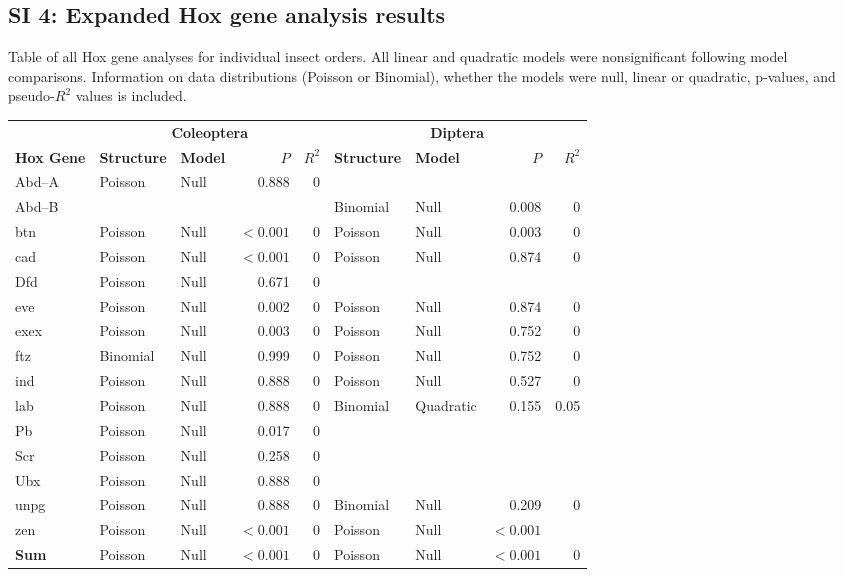 \documentclass[11pt]{article}
\begin{document}
\subsection*{SI 4: Expanded Hox gene analysis results}
Table of all Hox gene analyses for individual insect orders. All linear and quadratic models were nonsignificant following model comparisons. Information on data distributions (Poisson or Binomial), whether the models were null, linear or quadratic, p-values, and pseudo-$R^2$ values is included.
\singlespacing
\centering
\begin{tabular}{lllrrllrr}

 & \multicolumn{4}{c}{\textbf{Coleoptera}} & \multicolumn{4}{c}{\textbf{Diptera}} \\
\cmidrule(lr){2-5} \cmidrule(lr){6-9}
\textbf{Hox Gene} & \textbf{Structure} & \textbf{Model} & \textbf{$P$} & \textbf{$R^2$} & \textbf{Structure} & \textbf{Model} & \textbf{$P$} & \textbf{$R^2$} \\
\cmidrule(lr){1-9}
Abd--A & Poisson & Null & 0.888 & 0 &&&& \\
Abd--B &  &  &  &  & Binomial & Null & 0.008 & 0 \\
btn & Poisson & Null & $<0.001$ & 0 & Poisson & Null & 0.003 & 0 \\
cad & Poisson & Null & $<0.001$ & 0 & Poisson & Null & 0.874 & 0 \\
Dfd & Poisson & Null & 0.671 & 0 &  &  &  &  \\
eve & Poisson & Null & 0.002 & 0 & Poisson & Null & 0.874 & 0 \\
exex & Poisson & Null & 0.003 & 0 & Poisson & Null & 0.752 & 0 \\
ftz & Binomial & Null & 0.999 & 0 & Poisson & Null & 0.752 & 0 \\
ind & Poisson & Null & 0.888 & 0 & Poisson & Null & 0.527 & 0 \\
lab	& Poisson & Null	& 0.888 &	0	&Binomial&	Quadratic &	0.155&	0.05\\
Pb	& Poisson & Null	& 0.017&	0		& & & &	\\	
Scr	& Poisson & Null	 & 0.258	 & 0			& & & &	\\		
Ubx	& Poisson & Null & 	0.888	 & 0				& & & &\\		
unpg & Poisson & Null & 	0.888	 & 0 & 	Binomial	 & Null & 	0.209	 & 0\\
zen	& Poisson & Null & 	$<0.001$	 & 0	 & Poisson	 & Null	 & $<0.001$	 & \\
\cmidrule(lr){2-5} \cmidrule(lr){6-9}
\textbf{Sum} & Poisson & Null & $<0.001$ & 0 & Poisson & Null & $<0.001$ & 0 \\
\cmidrule(lr){1-9}
\end{tabular}
\end{document}
